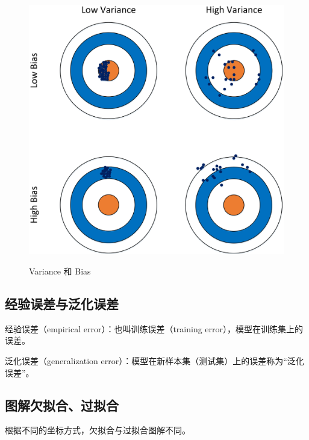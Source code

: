 \begin{itemize}
\begin{itemize}
 \begin{figure}[h]
   \centering
   \includegraphics[width=.9\textwidth]{imgs/2.16.20.1.eps}
   \label{fig:2.16.20.1}
	 \caption{Variance 和 Bias}
 \end{figure}

		\end{itemize}
\end{itemize}

\subsection{经验误差与泛化误差}

经验误差（empirical error）：也叫训练误差（training error），模型在训练集上的误差。

泛化误差（generalization error）：模型在新样本集（测试集）上的误差称为``泛化误差''。

\subsection{图解欠拟合、过拟合}

根据不同的坐标方式，欠拟合与过拟合图解不同。

